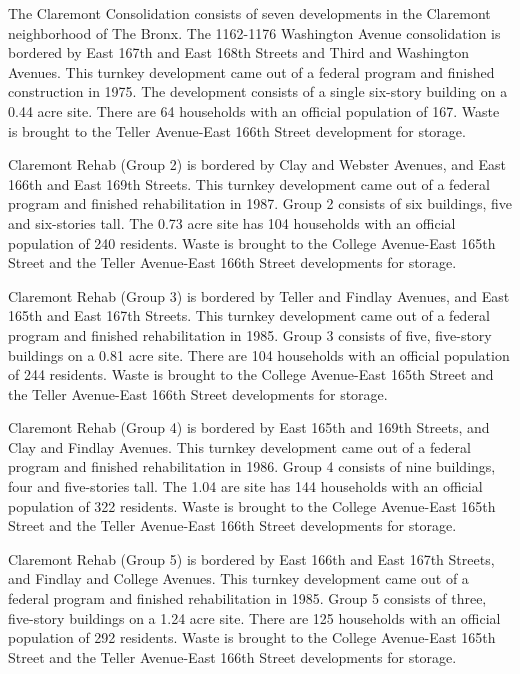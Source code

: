 
The Claremont Consolidation consists of seven developments in the Claremont neighborhood of The Bronx. The 1162-1176 Washington Avenue consolidation is bordered by East 167th and East 168th Streets and Third and Washington Avenues. This turnkey development came out of a federal program and finished construction in 1975. The development consists of a single six-story building on a 0.44 acre site. There are 64 households with an official population of 167. Waste is brought to the Teller Avenue-East 166th Street development for storage.

Claremont Rehab (Group 2) is bordered by Clay and Webster Avenues, and East 166th and East 169th Streets. This turnkey development came out of a federal program and finished rehabilitation in 1987. Group 2 consists of six buildings, five and six-stories tall. The 0.73 acre site has 104 households with an official population of 240 residents. Waste is brought to the College Avenue-East 165th Street and the Teller Avenue-East 166th Street developments for storage.

Claremont Rehab (Group 3) is bordered by Teller and Findlay Avenues, and East 165th and East 167th Streets. This turnkey development came out of a federal program and finished rehabilitation in 1985. Group 3 consists of five, five-story buildings on a 0.81 acre site. There are 104 households with an official population of 244 residents. Waste is brought to the College Avenue-East 165th Street and the Teller Avenue-East 166th Street developments for storage.

Claremont Rehab (Group 4) is bordered by East 165th and 169th Streets, and Clay and Findlay Avenues. This turnkey development came out of a federal program and finished rehabilitation in 1986. Group 4 consists of nine buildings, four and five-stories tall. The 1.04 are site has 144 households with an official population of 322 residents. Waste is brought to the College Avenue-East 165th Street and the Teller Avenue-East 166th Street developments for storage.

Claremont Rehab (Group 5) is bordered by East 166th and East 167th Streets, and Findlay and College Avenues. This turnkey development came out of a federal program and finished rehabilitation in 1985. Group 5 consists of three, five-story buildings on a 1.24 acre site. There are 125 households with an official population of 292 residents. Waste is brought to the College Avenue-East 165th Street and the Teller Avenue-East 166th Street developments for storage.

